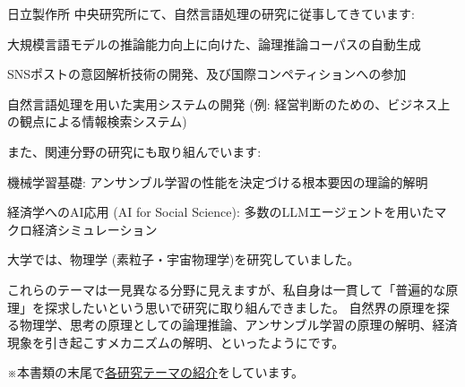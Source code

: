 \newenvironment{aboutitemize}{%
  \begin{cvsmallitemize}%
}{%
  \end{cvsmallitemize}%
}

日立製作所 中央研究所にて、自然言語処理の研究に従事してきています:

\vspace{1mm}

\begin{aboutitemize}
  \item 大規模言語モデルの推論能力向上に向けた、論理推論コーパスの自動生成
  \item SNSポストの意図解析技術の開発、及び国際コンペティションへの参加
  \item 自然言語処理を用いた実用システムの開発 (例: 経営判断のための、ビジネス上の観点による情報検索システム)
\end{aboutitemize}

\vspace{3mm}

また、関連分野の研究にも取り組んでいます:
\vspace{1mm}
\begin{aboutitemize}
  \item 機械学習基礎: アンサンブル学習の性能を決定づける根本要因の理論的解明
  \item 経済学へのAI応用 (AI for Social Science): 多数のLLMエージェントを用いたマクロ経済シミュレーション
\end{aboutitemize}
\vspace{0.5mm}


\vspace{3mm}
大学では、物理学 (素粒子・宇宙物理学)を研究していました。


\vspace{3mm}
これらのテーマは一見異なる分野に見えますが、私自身は一貫して「普遍的な原理」を探求したいという思いで研究に取り組んできました。
自然界の原理を探る物理学、思考の原理としての論理推論、アンサンブル学習の原理の解明、経済現象を引き起こすメカニズムの解明、といったようにです。

\vspace{3mm}
{\raggedleft ※本書類の末尾で\hyperlink{cvresearchtopics}{\underline{各研究テーマの紹介}}をしています。\par}
